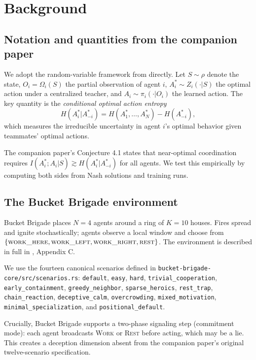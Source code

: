 \documentclass{article}
\begin{document}
\section{Background}
\label{sec:background}

\subsection{Notation and quantities from the companion paper}

We adopt the random-variable framework from \cite{walters2026slepianwolf}
directly.  Let $S \sim \rho$ denote the state, $O_i = \Omega_i(S)$ the partial
observation of agent $i$, $A_i^* \sim Z_i(\cdot|S)$ the optimal action under a
centralized teacher, and $A_i \sim \pi_i(\cdot|O_i)$ the learned action.  The
key quantity is the \emph{conditional optimal action entropy}
\[
  H(A_i^*|A_{-i}^*) = H(A_1^*,\ldots,A_N^*) - H(A_{-i}^*),
\]
which measures the irreducible uncertainty in agent $i$'s optimal behavior
given teammates' optimal actions.

The companion paper's Conjecture 4.1 states that near-optimal coordination
requires $I(A_i^*; A_i|S) \gtrsim H(A_i^*|A_{-i}^*)$ for all agents.  We
test this empirically by computing both sides from Nash solutions and training
runs.

\subsection{The Bucket Brigade environment}

Bucket Brigade places $N=4$ agents around a ring of $K=10$ houses.  Fires
spread and ignite stochastically; agents observe a local window and choose
from $\{\textsc{work\_here}, \textsc{work\_left}, \textsc{work\_right},
\textsc{rest}\}$.  The environment is described in full in
\cite{walters2026slepianwolf}, Appendix C.

We use the fourteen canonical scenarios defined in
\texttt{bucket-brigade-core/src/scenarios.rs}: \texttt{default}, \texttt{easy},
\texttt{hard}, \texttt{trivial\_cooperation}, \texttt{early\_containment},
\texttt{greedy\_neighbor}, \texttt{sparse\_heroics}, \texttt{rest\_trap},
\texttt{chain\_reaction}, \texttt{deceptive\_calm}, \texttt{overcrowding},
\texttt{mixed\_motivation}, \texttt{minimal\_specialization}, and
\texttt{positional\_default}.

Crucially, Bucket Brigade supports a two-phase signaling step (commitment
mode): each agent broadcasts \textsc{Work} or \textsc{Rest} before acting,
which may be a lie.  This creates a deception dimension absent from the
companion paper's original twelve-scenario specification.
\end{document}
